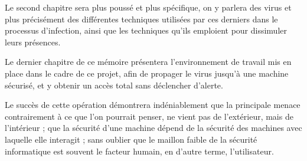 Le second chapitre sera plus poussé et plus spécifique, on y parlera des virus
et plus précisément des différentes techniques utilisées par ces derniers dans le processus d’infection, 
ainsi que les techniques qu’ils emploient pour dissimuler leurs présences.

Le dernier chapitre de ce mémoire présentera l'environnement de travail
mis en place  dans le cadre de ce projet, afin de propager le virus jusqu’à une machine sécurisé, et y obtenir un 
accès total sans déclencher d’alerte.

Le succès de cette opération démontrera indéniablement que la principale menace contrairement à ce que l’on pourrait 
penser, ne vient pas de l'extérieur, mais de l'intérieur ; que la sécurité d’une machine dépend  de la 
sécurité des machines avec laquelle elle interagit ; sans oublier que le maillon faible de la sécurité 
informatique est souvent le facteur humain, en d'autre terme, l'utilisateur.